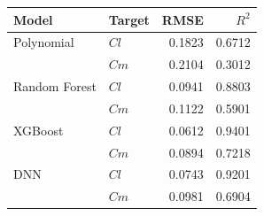 \begin{tabular}{llrr}
\toprule
Model & Target & RMSE & $R^2$ \\ \midrule
Polynomial & $Cl$ & 0.1823 & 0.6712 \\
 & $Cm$ & 0.2104 & 0.3012 \\
Random Forest & $Cl$ & 0.0941 & 0.8803 \\
 & $Cm$ & 0.1122 & 0.5901 \\
XGBoost & $Cl$ & 0.0612 & 0.9401 \\
 & $Cm$ & 0.0894 & 0.7218 \\
DNN & $Cl$ & 0.0743 & 0.9201 \\
 & $Cm$ & 0.0981 & 0.6904 \\
\bottomrule
\end{tabular}